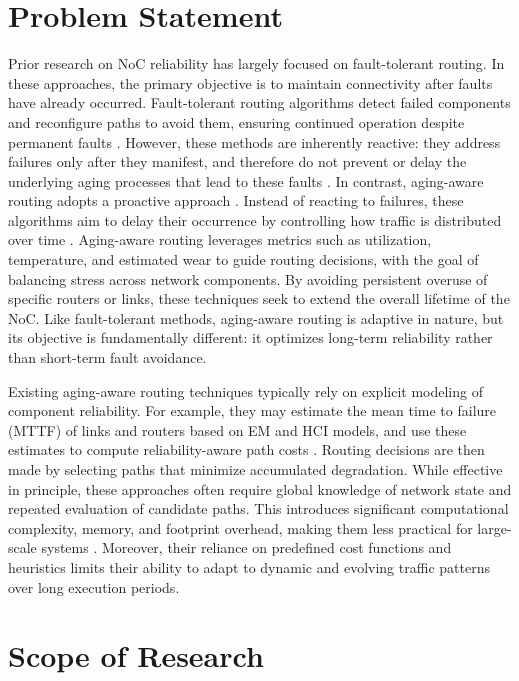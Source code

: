 \section{Problem Statement}

Prior research on NoC reliability has largely focused on fault-tolerant routing. In these approaches, the primary objective is to maintain connectivity after faults have already occurred. Fault-tolerant routing algorithms detect failed components and reconfigure paths to avoid them, ensuring continued operation despite permanent faults \cite{Adnan2025} \cite{Samala2020} \cite{Samala2022}. However, these methods are inherently reactive: they address failures only after they manifest, and therefore do not prevent or delay the underlying aging processes that lead to these faults \cite{Kondoth2026}. In contrast, aging-aware routing adopts a proactive approach \cite{Clotho2015} \cite{AROMa2018}. Instead of reacting to failures, these algorithms aim to delay their occurrence by controlling how traffic is distributed over time \cite{Kondoth2026}. Aging-aware routing leverages metrics such as utilization, temperature, and estimated wear to guide routing decisions, with the goal of balancing stress across network components. By avoiding persistent overuse of specific routers or links, these techniques seek to extend the overall lifetime of the NoC. Like fault-tolerant methods, aging-aware routing is adaptive in nature, but its objective is fundamentally different: it optimizes long-term reliability rather than short-term fault avoidance.

Existing aging-aware routing techniques typically rely on explicit modeling of component reliability. For example, they may estimate the mean time to failure (MTTF) of links and routers based on EM and HCI models, and use these estimates to compute reliability-aware path costs \cite{Clotho2015}. Routing decisions are then made by selecting paths that minimize accumulated degradation. While effective in principle, these approaches often require global knowledge of network state and repeated evaluation of candidate paths. This introduces significant computational complexity, memory, and footprint overhead, making them less practical for large-scale systems  \cite{Clotho2015} \cite{Bhardwaj2012}. Moreover, their reliance on predefined cost functions and heuristics limits their ability to adapt to dynamic and evolving traffic patterns over long execution periods.

\section{Scope of Research}

